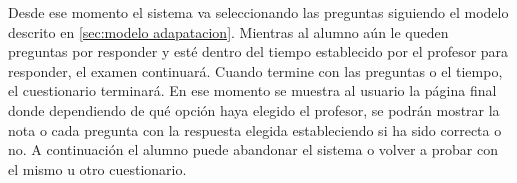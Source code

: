 Desde ese momento el sistema va seleccionando las preguntas siguiendo el modelo descrito en \ref{sec:modelo adapatacion}. Mientras al alumno aún le queden preguntas por responder y esté dentro del tiempo establecido por el profesor para responder, el examen continuará. Cuando termine con las preguntas o el tiempo, el cuestionario terminará. En ese momento se muestra al usuario la página final donde dependiendo de qué opción haya elegido el profesor, se podrán mostrar la nota o cada pregunta con la respuesta elegida estableciendo si ha sido correcta o no. A continuación el alumno puede abandonar el sistema o volver a probar con el mismo u otro cuestionario.

